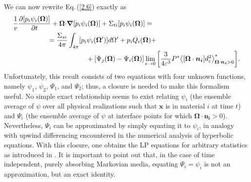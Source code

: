 \documentclass[12pt]{article}
\newcommand{\ep}{\varepsilon}
\newcommand{\bl}{\big<}
\newcommand{\bg}{\big>}
\begin{document}
We can now rewrite Eq.$\,$(\ref{2.6}) exactly as
\begin{equation}\label{lpquase}
\begin{split}
\frac{1}{v}\frac{\partial [p_i\psi_i(\bm\Omega)]}{\partial t}+ \bm\Omega\cdot &\bm\nabla[p_i\psi_i(\bm\Omega)] + \Sigma_{ti}[p_i\psi_i(\bm\Omega)] =
\\& \hspace{-1.0 cm} =
 \frac{\Sigma_{si}}{4\pi}\int_{4\pi}[p_i\psi_i(\bm\Omega')]d\Omega'+p_iQ_i(\bm\Omega) +
 \\& \hspace{1.0 cm}+
 [\Psi_j(\bm\Omega) - \Psi_i(\bm\Omega)]\lim_{\epsilon\rightarrow 0}
\bigg[\frac{3}{4\ep^3}P^*\bl[\bm\Omega\cdot \bm{n_i}]d_{\ep}^2\bg^*_{\bm\Omega\cdot\bm{n_i}>0}\bigg].
\end{split}
\end{equation}
Unfortunately, this result consists of two equations with four unknown functions, namely $\psi_1$, $\psi_2$, $\Psi_1$, and $\Psi_2$; thus, a closure is needed to make this formalism useful.
No simple exact relationship seems to exist relating $\psi_i$ (the ensemble average of $\psi$ over all physical realizations such that $\bm x$ is in material $i$ at time $t$) and $\Psi_i$ (the ensemble average of $\psi$ at interface points for which $\bm\Omega\cdot\bm{n_i}>0$).
Nevertheless, $\Psi_i$ can be approximated by simply equating it to $\psi_i$, in analogy with upwind differencing encountered in the numerical analysis of hyperbolic equations.
With this closure, one obtains the LP equations for arbitrary statistics as introduced in \cite{adams_89}.
It is important to point out that, in the case of time independent, purely absorbing Markovian media, equating $\Psi_i=\psi_i$ is not an approximation, but an exact identity.
\end{document}
